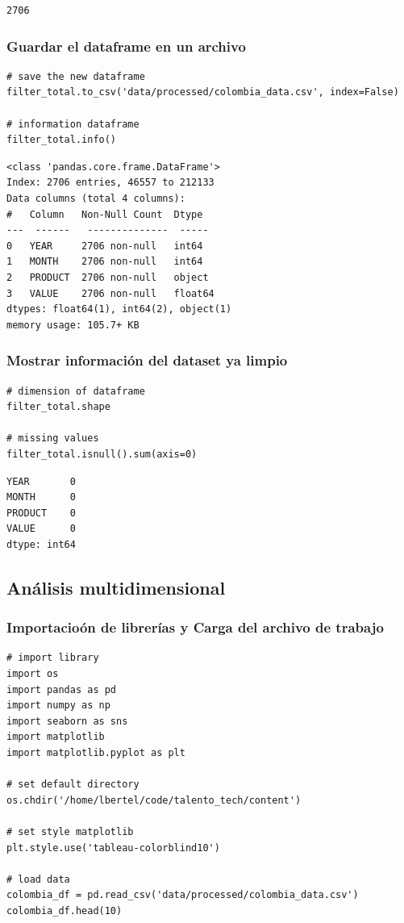 \documentclass{article}
\begin{document}
\begin{verbatim}
2706
\end{verbatim}

\subsubsection{Guardar el dataframe en un archivo}

\begin{verbatim}
# save the new dataframe
filter_total.to_csv('data/processed/colombia_data.csv', index=False)

# information dataframe
filter_total.info()
\end{verbatim}

\begin{verbatim}
<class 'pandas.core.frame.DataFrame'>
Index: 2706 entries, 46557 to 212133
Data columns (total 4 columns):
#   Column   Non-Null Count  Dtype  
---  ------   --------------  -----  
0   YEAR     2706 non-null   int64  
1   MONTH    2706 non-null   int64  
2   PRODUCT  2706 non-null   object 
3   VALUE    2706 non-null   float64
dtypes: float64(1), int64(2), object(1)
memory usage: 105.7+ KB
\end{verbatim}

\subsubsection{Mostrar informaci\'on del dataset ya limpio}

\begin{verbatim}
# dimension of dataframe
filter_total.shape

# missing values
filter_total.isnull().sum(axis=0)
\end{verbatim}

\begin{verbatim}
YEAR       0
MONTH      0
PRODUCT    0
VALUE      0
dtype: int64
\end{verbatim}

\subsection{An\'alisis multidimensional}

\subsubsection{Importacio\'on de librer\'ias y Carga del archivo de trabajo}

\begin{verbatim}
# import library
import os
import pandas as pd
import numpy as np
import seaborn as sns
import matplotlib
import matplotlib.pyplot as plt

# set default directory
os.chdir('/home/lbertel/code/talento_tech/content')

# set style matplotlib
plt.style.use('tableau-colorblind10')

# load data
colombia_df = pd.read_csv('data/processed/colombia_data.csv')
colombia_df.head(10)
\end{verbatim}
\end{document}
